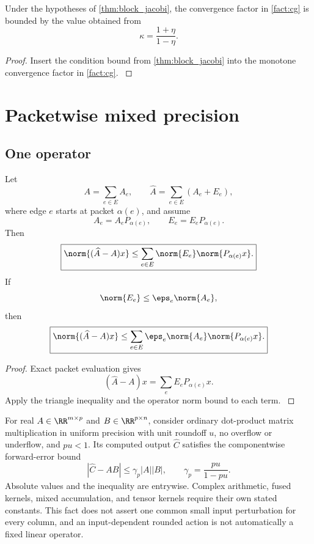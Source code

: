 \begin{corollary}\label{main:corollary:011}\label{cor:certified_pcg}
Under the hypotheses of \cref{thm:block_jacobi}, the convergence factor in \cref{fact:cg} is bounded by the value obtained from
\[
\kappa
=
\frac{1+\eta}{1-\eta}.
\]
\end{corollary}

\begin{proof}\label{main:proof:036}
Insert the condition bound from \cref{thm:block_jacobi} into the monotone convergence factor in \cref{fact:cg}.
\label{main:proof:036:end}\end{proof}

\section{Packetwise mixed precision}\label{main:section:008}\label{sec:precision}

\subsection{One operator}\label{main:subsection:008}

\begin{theorem}\label{main:theorem:019}\label{thm:packet_error}
Let
\[
A=
\sum_{e\in E}A_e,
\qquad
\widehat A
=
\sum_{e\in E}(A_e+E_e),
\]
where edge \(e\) starts at packet \(\alpha(e)\), and assume
\[
A_e=A_eP_{\alpha(e)},
\qquad
E_e=E_eP_{\alpha(e)}.
\]
Then
\[
\boxed{
\norm{(\widehat A-A)x}
\leq
\sum_{e\in E}
\norm{E_e}
\norm{P_{\alpha(e)}x}.
}
\]
If
\[
\norm{E_e}
\leq
\eps_e\norm{A_e},
\]
then
\[
\boxed{
\norm{(\widehat A-A)x}
\leq
\sum_{e\in E}
\eps_e\norm{A_e}
\norm{P_{\alpha(e)}x}.
}
\]
\end{theorem}

\begin{proof}\label{main:proof:037}
Exact packet evaluation gives
\[
(\widehat A-A)x
=
\sum_eE_eP_{\alpha(e)}x.
\]
Apply the triangle inequality and the operator norm bound to each term.
\label{main:proof:037:end}\end{proof}

\begin{standardfact}\label{main:standardfact:003}\label{fact:rounding}
For real $A\in\RR^{m\times p}$ and $B\in\RR^{p\times n}$, consider ordinary dot-product matrix multiplication in uniform precision with unit roundoff $u$, no overflow or underflow, and $pu<1$. Its computed output $\widehat C$ satisfies the componentwise forward-error bound
\[
|\widehat C-AB|\le\gamma_p|A||B|,
\qquad\gamma_p=\frac{pu}{1-pu}.
\]
Absolute values and the inequality are entrywise. Complex arithmetic, fused kernels, mixed accumulation, and tensor kernels require their own stated constants. This fact does not assert one common small input perturbation for every column, and an input-dependent rounded action is not automatically a fixed linear operator.
\end{standardfact}

